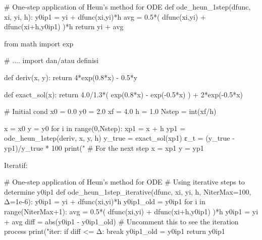 \begin{pythoncode}
# One-step application of Heun's method for ODE
def ode_heun_1step(dfunc, xi, yi, h):
    y0ip1 = yi + dfunc(xi,yi)*h
    avg = 0.5*( dfunc(xi,yi) + dfunc(xi+h,y0ip1) )*h
    return yi + avg
\end{pythoncode}

\begin{pythoncode}
from math import exp

# .... import dan/atau definisi

def deriv(x, y):
    return 4*exp(0.8*x) - 0.5*y
    
def exact_sol(x):
    return 4.0/1.3*( exp(0.8*x) - exp(-0.5*x) ) + 2*exp(-0.5*x)
    
# Initial cond
x0 = 0.0
y0 = 2.0
xf = 4.0
h = 1.0
Nstep = int(xf/h)
    
x = x0
y = y0
for i in range(0,Nstep):
    xp1 = x + h
    yp1 = ode_heun_1step(deriv, x, y, h)
    y_true = exact_sol(xp1)
    ε_t = (y_true - yp1)/y_true * 100
    print("%
    # For the next step
    x = xp1
    y = yp1    
\end{pythoncode}


Iteratif:
\begin{pythoncode}
# One-step application of Heun's method for ODE
# Using iterative steps to determine y0ip1
def ode_heun_1step_iterative(dfunc, xi, yi, h, NiterMax=100, Δ=1e-6):
    y0ip1 = yi + dfunc(xi,yi)*h
    y0ip1_old = y0ip1
    for i in range(NiterMax+1):
        avg = 0.5*( dfunc(xi,yi) + dfunc(xi+h,y0ip1) )*h
        y0ip1 = yi + avg
        diff = abs(y0ip1 - y0ip1_old)
        # Uncomment this to see the iteration process
        print("iter: %
        if diff <= Δ:
            break
        y0ip1_old = y0ip1
    return y0ip1
\end{pythoncode}
